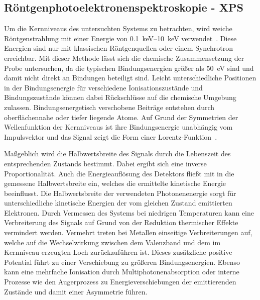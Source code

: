         \subsection{Röntgenphotoelektronenspektroskopie - XPS} \label{sec:XPS}
            Um die Kernniveaus des untersuchten Systems zu betrachten, wird weiche Röntgenstrahlung mit einer Energie von \SIrange{0.1}{10}{\kilo\electronvolt} verwendet~\cite{Fauster}.
            Diese Energien sind nur mit klassischen Röntgenquellen oder einem Synchrotron erreichbar.
            Mit dieser Methode lässt sich die chemische Zusammensetzung der Probe untersuchen, da die typischen Bindungsenergien größer als \SI{50}{\electronvolt} sind und damit nicht direkt an Bindungen beteiligt sind.
            Leicht unterschiedliche Positionen in der Bindungsenergie für verschiedene Ionisationszustände und Bindungszustände können dabei Rückschlüsse auf die chemische Umgebung zulassen.
            Bindungsenergetisch verschobene Beiträge entstehen durch oberflächennahe oder tiefer liegende Atome.
            Auf Grund der Symmetrien der Wellenfunktion der Kernniveaus ist ihre Bindungsenergie unabhängig vom Impulsvektor und das Signal zeigt die Form einer Lorentz-Funktion~\cite{Hüfner}.

            Maßgeblich wird die Halbwertsbreite des Signals durch die Lebenszeit des entsprechenden Zustands bestimmt.
            Dabei ergibt sich eine inverse Proportionalität.
            Auch die Energieauflösung des Detektors fließt mit in die gemessene Halbwertsbreite ein, welches die ermittelte kinetische Energie beeinflusst.
            Die Halbwertsbreite der verwendeten Photonenenergie sorgt für unterschiedliche kinetische Energien der vom gleichen Zustand emittierten Elektronen.
            Durch Vermessen des Systems bei niedrigen Temperaturen kann eine Verbreiterung des Signals auf Grund von der Reduktion thermischer Effekte vermindert werden.
            Vermehrt treten bei Metallen einseitige Verbreiterungen auf, welche auf die Wechselwirkung zwischen dem Valenzband und dem im Kernniveau erzeugten Loch zurückzuführen ist.
            Dieses zusätzliche positive Potential führt zu einer Verschiebung zu größeren Bindungsenergien.
            Ebenso kann eine mehrfache Ionisation durch Multiphotonenabsorption oder interne Prozesse wie den Augerprozess zu Energieverschiebungen der emittierenden Zustände und damit einer Asymmetrie führen.

